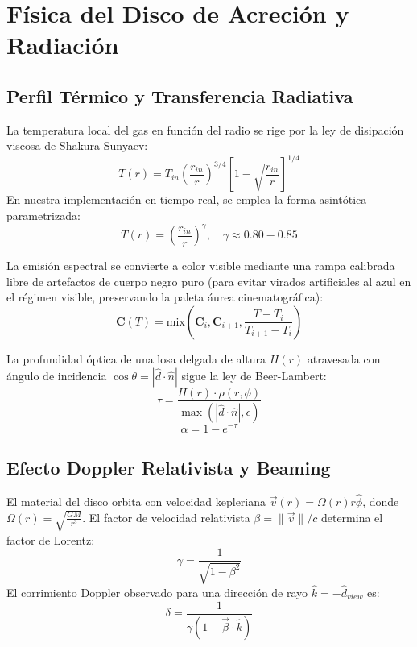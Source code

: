 \documentclass[10pt,twocolumn,a4paper]{article}
\begin{document}
\section{Física del Disco de Acreción y Radiación}

\subsection{Perfil Térmico y Transferencia Radiativa}
La temperatura local del gas en función del radio se rige por la ley de disipación viscosa de Shakura-Sunyaev:
\begin{equation}
T(r) = T_{in} \left(\frac{r_{in}}{r}\right)^{3/4} \left[1 - \sqrt{\frac{r_{in}}{r}}\right]^{1/4}
\end{equation}
En nuestra implementación en tiempo real, se emplea la forma asintótica parametrizada:
\begin{equation}
T(r) = \left(\frac{r_{in}}{r}\right)^{\gamma}, \quad \gamma \approx 0.80 - 0.85
\end{equation}

La emisión espectral se convierte a color visible mediante una rampa calibrada libre de artefactos de cuerpo negro puro (para evitar virados artificiales al azul en el régimen visible, preservando la paleta áurea cinematográfica):
\begin{equation}
\mathbf{C}(T) = \text{mix}\left(\mathbf{C}_i, \mathbf{C}_{i+1}, \frac{T - T_i}{T_{i+1} - T_i}\right)
\end{equation}

La profundidad óptica de una losa delgada de altura $H(r)$ atravesada con ángulo de incidencia $\cos\theta = |\hat{d} \cdot \hat{n}|$ sigue la ley de Beer-Lambert:
\begin{equation}
\tau = \frac{H(r) \cdot \rho(r, \phi)}{\max(|\hat{d} \cdot \hat{n}|, \epsilon)}
\end{equation}
\begin{equation}
\alpha = 1 - e^{-\tau}
\end{equation}

\subsection{Efecto Doppler Relativista y Beaming}
El material del disco orbita con velocidad kepleriana $\vec{v}(r) = \Omega(r) r \hat{\phi}$, donde $\Omega(r) = \sqrt{\frac{GM}{r^3}}$.
El factor de velocidad relativista $\beta = \|\vec{v}\|/c$ determina el factor de Lorentz:
\begin{equation}
\gamma = \frac{1}{\sqrt{1 - \beta^2}}
\end{equation}
El corrimiento Doppler observado para una dirección de rayo $\hat{k} = -\hat{d}_{view}$ es:
\begin{equation}
\delta = \frac{1}{\gamma \left(1 - \vec{\beta} \cdot \hat{k}\right)}
\end{equation}
\end{document}

